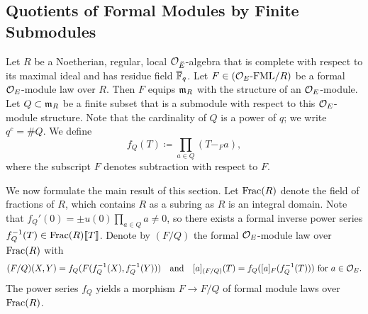 \documentclass[../main.tex]{subfiles}
\begin{document}
\subsection{Quotients of Formal Modules by Finite Submodules} %
\label{sub:Quotients of Formal Modules by Finite Submodules}
Let $R$ be a Noetherian, regular, local $\mathcal{O}_{\breve {E}}$-algebra 
that is complete with respect to its maximal ideal and has residue field ${\overline {\mathbb{F}}_q}$.
Let $F \in {({\mathcal{O}_E}\textnormal-\allowbreak\mathrm{FML}/{R})}$ be a formal $\mathcal{O}_E$-module law over $R$. 
Then $F$ equips $\mathfrak{m}_R$ with the structure
of an $\mathcal{O}_E$-module. Let $Q \subset \mathfrak{m}_R$ be a finite subset
that is a submodule with respect to this $\mathcal{O}_E$-module structure. Note
that the cardinality of $Q$ is a power of $q$; we write $q^c = \# Q$.
We define
\begin{equation*}
  f_Q(T) \coloneq \prod_{a \in Q}\left(T -_F a\right),
\end{equation*}
where the subscript $F$ denotes subtraction with respect to $F$. 

We now formulate the main result of this section. Let $\mathrm{Frac}(R)$ denote the field of 
fractions of $R$, which contains $R$ as a subring as $R$ is an integral domain.
Note that $f_Q'(0) = \pm u(0) \prod_{a \in Q} a \neq 0$, so there exists
a formal inverse power series $f_Q^{-1}(T) \in \mathrm{Frac}(R) \llbracket T \rrbracket$.
Denote by $(F/Q)$ the formal $\mathcal{O}_E$-module law over $\mathrm{Frac}(R)$ with 
\begin{equation*}
  (F/Q)(X,Y) = f_Q ( F( f_Q^{-1}(X), f_Q^{-1}(Y)))\quad \text{and} \quad
  [a]_{(F/Q)}(T) = f_Q([a]_F(f_Q^{-1}(T)))\text{ for $a \in \mathcal{O}_E$}.
\end{equation*}
The power series $f_Q$ yields a morphism $F \to F/Q$ of formal module
laws over $\mathrm{Frac}(R)$.
\end{document}
